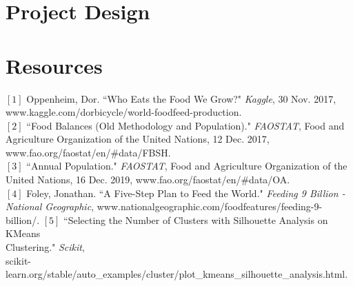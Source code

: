 \documentclass[12pt, a4paper]{article}
\begin{document}
\begin{spacing}{1.1}
	
	
	\section{Project Design}
	
	


	\newpage
	\section{Resources}
	$[1]$ Oppenheim, Dor. ``Who Eats the Food We Grow?" \textit{Kaggle}, 30 Nov. 2017, \\ \hspace*{5mm} www.kaggle.com/dorbicycle/world-foodfeed-production. \vspace*{2.5mm}\\
	$[2]$ ``Food Balances (Old Methodology and Population)." \textit{FAOSTAT}, Food and \\ \hspace*{5mm} Agriculture Organization of the United Nations, 12 Dec. 2017, \\ \hspace*{5mm} www.fao.org/faostat/en/\#data/FBSH. \vspace*{2.5mm}\\
	$[3]$ ``Annual Population." \textit{FAOSTAT}, Food and Agriculture Organization of the \\ \hspace*{5mm} United Nations, 16 Dec. 2019, www.fao.org/faostat/en/\#data/OA. \vspace*{2.5mm}\\
	$[4]$ Foley, Jonathan. ``A Five-Step Plan to Feed the World." \textit{Feeding 9 Billion - \\ \hspace*{5mm} National Geographic}, www.nationalgeographic.com/foodfeatures/feeding-9-billion/. 
	$[5]$ ``Selecting the Number of Clusters with Silhouette Analysis on KMeans \\ \hspace*{5mm} Clustering." \textit{Scikit}, 
	\\ \hspace*{6mm} scikit-learn.org/stable/auto\_examples/cluster/plot\_kmeans\_silhouette\_analysis.html. 

\end{spacing}
\end{document}
